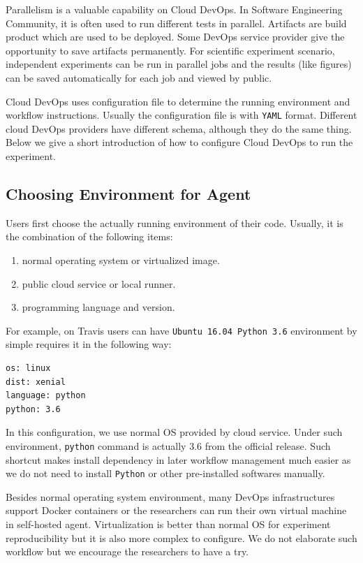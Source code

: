 \documentclass{IEEEcsmag}
\begin{document}
Parallelism is a valuable capability on Cloud DevOps. In Software Engineering Community, it is often used to run different tests in parallel. Artifacts are build product which are used to be deployed.
Some DevOps service provider give the opportunity to save artifacts permanently. For scientific experiment scenario, independent experiments can be run in parallel jobs and the results (like figures) can be saved automatically for each job and viewed by public.

Cloud DevOps uses configuration file to determine the running environment and workflow instructions. 
Usually the configuration file is with \texttt{YAML} format. Different cloud DevOps providers have different schema, although they do the same thing. Below we give a short introduction of how to configure Cloud DevOps to run the experiment.
\subsection{Choosing Environment for Agent}
Users first choose the actually running environment of their code. Usually, it is the combination of the following items:
\begin{enumerate}
\item normal operating system or virtualized image.
\item public cloud service or local runner.
\item programming language and version.
\end{enumerate}

For example, on \textsf{Travis} users can have  \texttt{Ubuntu 16.04 Python 3.6} environment by simple requires it in the following way:
\begin{lstlisting}[caption={environment configuration}]
os: linux
dist: xenial
language: python
python: 3.6
\end{lstlisting}

In this configuration, we use normal OS provided by cloud service. Under such environment, \texttt{python} command is actually 3.6 from the official release.
Such shortcut makes install dependency in later workflow management much easier as we do not need to install \texttt{Python} or other pre-installed softwares manually.

Besides normal operating system environment, many DevOps infrastructures support Docker containers or the researchers can run their own virtual machine in self-hosted agent. Virtualization is better than normal OS for experiment reproducibility but it is also more complex to configure. We do not elaborate such workflow but we encourage the researchers to have a try.
\end{document}
